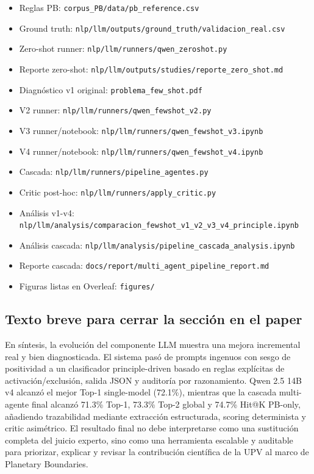 \begin{itemize}
\item Reglas PB: \texttt{corpus\_PB/data/pb\_reference.csv}
\item Ground truth: \texttt{nlp/llm/outputs/ground\_truth/validacion\_real.csv}
\item Zero-shot runner: \texttt{nlp/llm/runners/qwen\_zeroshot.py}
\item Reporte zero-shot: \texttt{nlp/llm/outputs/studies/reporte\_zero\_shot.md}
\item Diagnóstico v1 original: \texttt{problema\_few\_shot.pdf}
\item V2 runner: \texttt{nlp/llm/runners/qwen\_fewshot\_v2.py}
\item V3 runner/notebook: \texttt{nlp/llm/runners/qwen\_fewshot\_v3.ipynb}
\item V4 runner/notebook: \texttt{nlp/llm/runners/qwen\_fewshot\_v4.ipynb}
\item Cascada: \texttt{nlp/llm/runners/pipeline\_agentes.py}
\item Critic post-hoc: \texttt{nlp/llm/runners/apply\_critic.py}
\item Análisis v1-v4: \texttt{nlp/llm/analysis/comparacion\_fewshot\_v1\_v2\_v3\_v4\_principle.ipynb}
\item Análisis cascada: \texttt{nlp/llm/analysis/pipeline\_cascada\_analysis.ipynb}
\item Reporte cascada: \texttt{docs/report/multi\_agent\_pipeline\_report.md}
\item Figuras listas en Overleaf: \texttt{figures/}
\end{itemize}

\subsection{Texto breve para cerrar la sección en el paper}

En síntesis, la evolución del componente LLM muestra una mejora incremental real y bien diagnosticada. El sistema pasó de prompts ingenuos con sesgo de positividad a un clasificador principle-driven basado en reglas explícitas de activación/exclusión, salida JSON y auditoría por razonamiento. Qwen 2.5 14B v4 alcanzó el mejor Top-1 single-model (72.1\%), mientras que la cascada multi-agente final alcanzó 71.3\% Top-1, 73.3\% Top-2 global y 74.7\% Hit@K PB-only, añadiendo trazabilidad mediante extracción estructurada, scoring determinista y critic asimétrico. El resultado final no debe interpretarse como una sustitución completa del juicio experto, sino como una herramienta escalable y auditable para priorizar, explicar y revisar la contribución científica de la UPV al marco de Planetary Boundaries.
